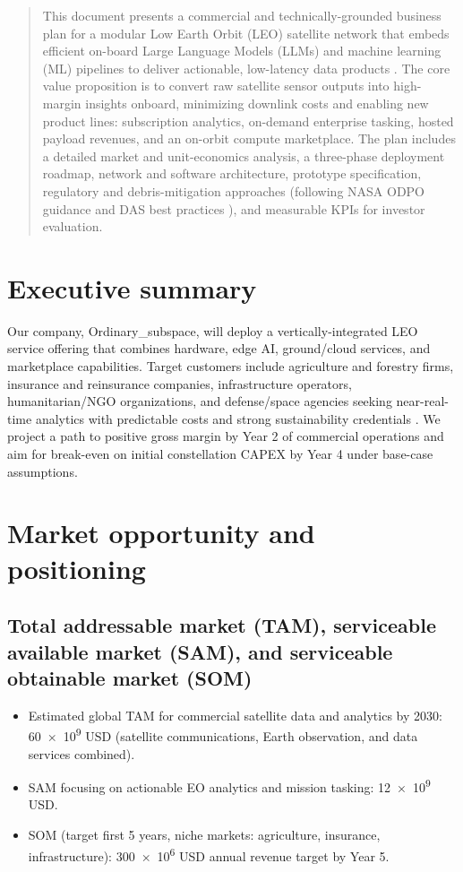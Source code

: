 \maketitle

\begin{abstract}
This document presents a commercial and technically-grounded business plan for a modular Low Earth Orbit (LEO) satellite network that embeds efficient on-board Large Language Models (LLMs) and machine learning (ML) pipelines to deliver actionable, low-latency data products \parencite{nasaopendata}. The core value proposition is to convert raw satellite sensor outputs into high-margin insights onboard, minimizing downlink costs and enabling new product lines: subscription analytics, on-demand enterprise tasking, hosted payload revenues, and an on-orbit compute marketplace. The plan includes a detailed market and unit-economics analysis, a three-phase deployment roadmap, network and software architecture, prototype specification, regulatory and debris-mitigation approaches (following NASA ODPO guidance \parencite{odpo} and DAS best practices \parencite{das}), and measurable KPIs for investor evaluation.
\end{abstract}


\section{Executive summary}
Our company, Ordinary\_subspace, will deploy a vertically-integrated LEO service offering that combines hardware, edge AI, ground/cloud services, and marketplace capabilities. Target customers include agriculture and forestry firms, insurance and reinsurance companies, infrastructure operators, humanitarian/NGO organizations, and defense/space agencies seeking near-real-time analytics with predictable costs and strong sustainability credentials \parencite{nasa_commercial}. We project a path to positive gross margin by Year 2 of commercial operations and aim for break-even on initial constellation CAPEX by Year 4 under base-case assumptions.

\section{Market opportunity and positioning}
\subsection{Total addressable market (TAM), serviceable available market (SAM), and serviceable obtainable market (SOM)}
\begin{itemize}
  \item Estimated global TAM for commercial satellite data and analytics by 2030: \num{60e9} USD (satellite communications, Earth observation, and data services combined).
  \item SAM focusing on actionable EO analytics and mission tasking: \num{12e9} USD.
  \item SOM (target first 5 years, niche markets: agriculture, insurance, infrastructure): \num{300e6} USD annual revenue target by Year 5.
\end{itemize}

